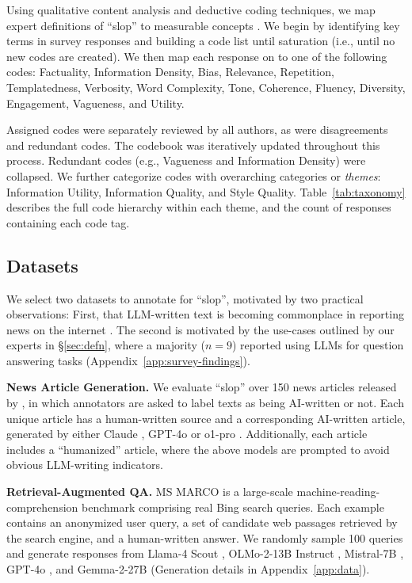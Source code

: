 \documentclass{article} %
\begin{document}
Using qualitative content analysis and deductive coding techniques, we map expert definitions of ``slop'' to measurable concepts \citep{Hsieh2005ThreeAT}. 
We begin by identifying key terms in survey responses and building a code list until saturation (i.e., until no new codes are created). 
We then map each response on to one of the following codes: Factuality, Information Density, Bias, Relevance, Repetition, Templatedness, Verbosity, Word Complexity, Tone, Coherence, Fluency, Diversity, Engagement, Vagueness, and Utility. 

Assigned codes were separately reviewed by all authors, as were disagreements and redundant codes. 
The codebook was iteratively updated throughout this process. 
Redundant codes (e.g., Vagueness and Information Density) were collapsed. %
We further categorize codes with overarching categories or \textit{themes}: \textcolor{infoutility}{Information Utility}, \textcolor{infoquality}{Information Quality}, and \textcolor{stylequality}{Style Quality}. 
Table~\ref{tab:taxonomy} describes the full code hierarchy within each theme, and the count of responses containing each code tag. 

\subsection{Datasets}
\label{sec:datasets}
We select two datasets to annotate for ``slop'', motivated by two practical observations: First, that LLM-written text is becoming commonplace in reporting news on the internet \citep{tomlinson2025working, Chatterji2025HowPU}. The second is motivated by the use-cases outlined by our experts in \S\ref{sec:defn}, where a majority ($n=9$) reported using LLMs for question answering tasks (Appendix~\ref{app:survey-findings}). 

\textbf{News Article Generation.}
We evaluate ``slop'' over 150 news articles released by \citet{Russell2025PeopleWF}, in which annotators are asked to label texts as being AI-written or not. 
Each unique article has a human-written source and a corresponding AI-written article, generated by either Claude \citep{anthropic2024model}, GPT-4o or o1-pro \citep{openai2024gpt4technicalreport}. 
Additionally, each article includes a ``humanized'' article, where the above models are prompted to avoid obvious LLM-writing indicators. 

\textbf{Retrieval-Augmented QA.}
MS MARCO \citep{Campos2016MSMA} is a large-scale machine-reading-comprehension benchmark comprising real Bing search queries. Each example contains an anonymized user query, a set of candidate web passages retrieved by the search engine, and a human-written answer. We randomly sample 100 queries and generate responses from  Llama-4 Scout \citep{meta2024llama4}, OLMo-2-13B Instruct \citep{olmo20252olmo2furious}, Mistral-7B \citep{jiang2023mistral7b}, GPT-4o \citep{openai2024gpt4technicalreport}, and Gemma-2-27B \citep{gemmateam2024gemma2improvingopen} (Generation details in Appendix~\ref{app:data}).
\end{document}
